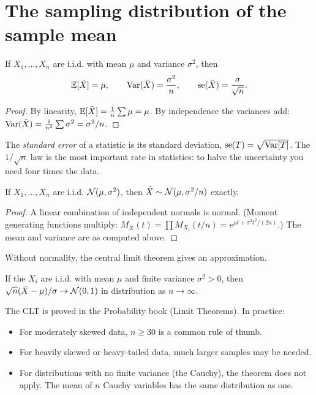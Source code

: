 \section{The sampling distribution of the sample mean}

\begin{theorem}\label{thm:xbar}
If $X_1,\dots,X_n$ are i.i.d. with mean $\mu$ and variance $\sigma^2$, then
\[ \mathbb{E}[\bar{X}]=\mu,\qquad\operatorname{Var}(\bar{X})=\frac{\sigma^2}n,\qquad\operatorname{se}(\bar{X})=\frac{\sigma}{\sqrt n}. \]
\end{theorem}

\begin{proof}
By linearity, $\mathbb{E}[\bar{X}]=\frac1n\sum\mu=\mu$. By independence the variances add: $\operatorname{Var}(\bar{X})=\frac1{n^2}\sum\sigma^2=\sigma^2/n$.
\end{proof}

The \emph{standard error} of a statistic is its standard deviation, $\operatorname{se}(T)=\sqrt{\operatorname{Var}[T]}$. The $1/\sqrt n$ law is the most important rate in statistics: to halve the uncertainty you need four times the data.

\begin{theorem}\label{thm:normalmean}
If $X_1,\dots,X_n$ are i.i.d. $\mathcal{N}(\mu,\sigma^2)$, then $\bar{X}\sim\mathcal{N}(\mu,\sigma^2/n)$ exactly.
\end{theorem}

\begin{proof}
A linear combination of independent normals is normal. (Moment generating functions multiply: $M_{\bar{X}}(t)=\prod M_{X_i}(t/n)=e^{\mu t+\sigma^2t^2/(2n)}$.) The mean and variance are as computed above.
\end{proof}

Without normality, the central limit theorem gives an approximation.

\begin{theorem}\label{thm:clt}
If the $X_i$ are i.i.d. with mean $\mu$ and finite variance $\sigma^2>0$, then $\sqrt n(\bar{X}-\mu)/\sigma\to\mathcal{N}(0,1)$ in distribution as $n\to\infty$.
\end{theorem}

The CLT is proved in the Probability book (Limit Theorems). In practice:
\begin{itemize}
  \item For moderately skewed data, $n\ge30$ is a common rule of thumb.
  \item For heavily skewed or heavy-tailed data, much larger samples may be needed.
  \item For distributions with no finite variance (the Cauchy), the theorem does not apply. The mean of $n$ Cauchy variables has the same distribution as one.
\end{itemize}

